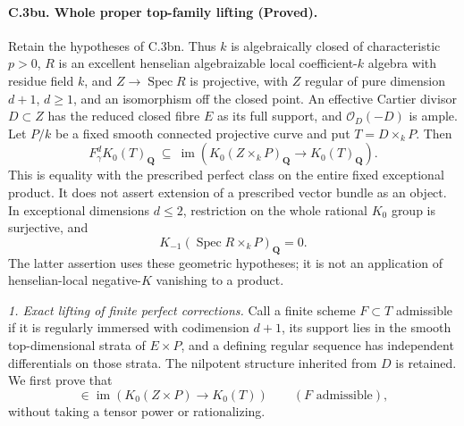 \paragraph{C.3bu. Whole proper top-family lifting (Proved).}
Retain the hypotheses of C.3bn.  Thus $k$ is algebraically closed of
characteristic $p>0$, $R$ is an excellent henselian algebraizable local
coefficient-$k$ algebra with residue field $k$, and
$Z\to\operatorname{Spec}R$ is projective, with $Z$ regular of pure
dimension $d+1$, $d\geq1$, and an isomorphism off the closed point.
An effective Cartier divisor $D\subset Z$ has the reduced closed fibre
$E$ as its full support, and $\mathcal O_D(-D)$ is ample.  Let $P/k$
be a fixed smooth connected projective curve and put $T=D\times_kP$.
Then
\begin{equation}
 F_\gamma^dK_0(T)_{\mathbf Q}\ \subseteq\
 \operatorname{im}\!\left(K_0(Z\times_kP)_{\mathbf Q}
                 \longrightarrow K_0(T)_{\mathbf Q}\right).
                                                        \tag{WP.1}
\end{equation}
This is equality with the prescribed perfect class on the entire
fixed exceptional product.  It does not assert extension of a
prescribed vector bundle as an object.  In exceptional dimensions
$d\leq2$, restriction on the whole rational $K_0$ group is surjective,
and
\begin{equation}
       K_{-1}(\operatorname{Spec}R\times_kP)_{\mathbf Q}=0.
                                                        \tag{WP.8}
\end{equation}
The latter assertion uses these geometric hypotheses; it is not an
application of henselian-local negative-$K$ vanishing to a product.

\emph{1. Exact lifting of finite perfect corrections.}
Call a finite scheme $F\subset T$ admissible if it is regularly
immersed with codimension $d+1$, its support lies in the smooth
top-dimensional strata of $E\times P$, and a defining regular
sequence has independent differentials on those strata.  The
nilpotent structure inherited from $D$ is retained.  We first prove
that
\begin{equation}
 [\mathcal O_F]\in\operatorname{im}\!\left(
           K_0(Z\times P)\longrightarrow K_0(T)\right)
       \qquad(F\text{ admissible}),                    \tag{WP.2}
\end{equation}
without taking a tensor power or rationalizing.

